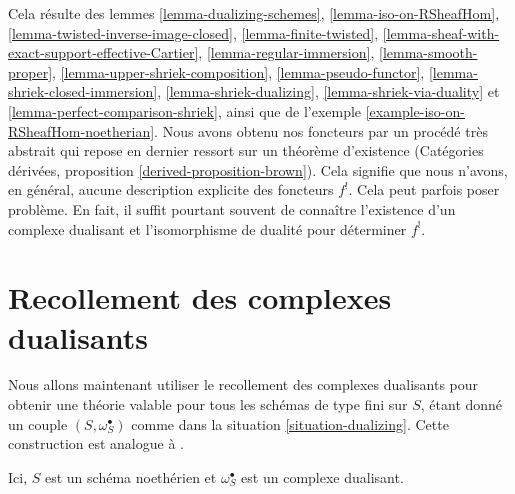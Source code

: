 Cela résulte des lemmes \ref{lemma-dualizing-schemes}, \ref{lemma-iso-on-RSheafHom}, \ref{lemma-twisted-inverse-image-closed}, \ref{lemma-finite-twisted}, \ref{lemma-sheaf-with-exact-support-effective-Cartier}, \ref{lemma-regular-immersion}, \ref{lemma-smooth-proper}, \ref{lemma-upper-shriek-composition}, \ref{lemma-pseudo-functor}, \ref{lemma-shriek-closed-immersion}, \ref{lemma-shriek-dualizing}, \ref{lemma-shriek-via-duality} et \ref{lemma-perfect-comparison-shriek}, ainsi que de l'exemple \ref{example-iso-on-RSheafHom-noetherian}. Nous avons obtenu nos foncteurs par un procédé très abstrait qui repose en dernier ressort sur un théorème d'existence (Catégories dérivées, proposition \ref{derived-proposition-brown}). Cela signifie que nous n'avons, en général, aucune description explicite des foncteurs $f^!$. Cela peut parfois poser problème. En fait, il suffit pourtant souvent de connaître l'existence d'un complexe dualisant et l'isomorphisme de dualité pour déterminer $f^!$.






\section{Recollement des complexes dualisants}
\label{section-glue}

\noindent
Nous allons maintenant utiliser le recollement des complexes dualisants pour obtenir une théorie valable pour tous les schémas de type fini sur $S$, étant donné un couple $(S, \omega_S^\bullet)$ comme dans la situation \ref{situation-dualizing}. Cette construction est analogue à \cite[Remark on page 310]{RD}.

\begin{situation}
\label{situation-dualizing}
Ici, $S$ est un schéma noethérien et $\omega_S^\bullet$ est un complexe dualisant.
\end{situation}

